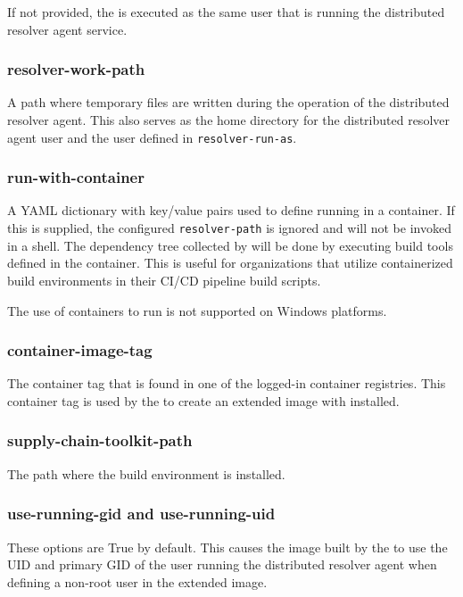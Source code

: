 If not provided, the \scaresolver is executed as the same user that is running the distributed resolver agent service.

\subsubsection{resolver-work-path}\label{sec:agent-resolver-work-path}
A path where temporary files are written during the operation of the distributed resolver agent.  This also serves as the home
directory for the distributed resolver agent user and the user defined in \texttt{resolver-run-as}.


\subsubsection{run-with-container}\label{sec:agent-run-with-container}
A YAML dictionary with key/value pairs used to define running \scaresolver in a container.  If this is supplied,
the configured \texttt{resolver-path} is ignored and \scaresolver will not be invoked in a shell.  The dependency
tree collected by \scaresolver will be done by executing build tools defined in the container.  This is useful for
organizations that utilize containerized build environments in their CI/CD pipeline build scripts.

The use of containers to run \scaresolver is not supported on Windows platforms.

\subsubsection{container-image-tag}\label{sec:agent-container-image-tag}
The container tag that is found in one of the logged-in container registries.  This container tag is used by the \toolkit
to create an extended image with \scaresolver installed.

\subsubsection{supply-chain-toolkit-path}\label{sec:agent-supply-chain-toolkit-path}
The path where the \toolkit build environment is installed.

\subsubsection{use-running-gid and use-running-uid}\label{sec:agent-use-running}
These options are True by default.  This causes the image built by the \toolkit to use the
UID and primary GID of the user running the distributed resolver agent when defining a non-root
user in the extended image.  

